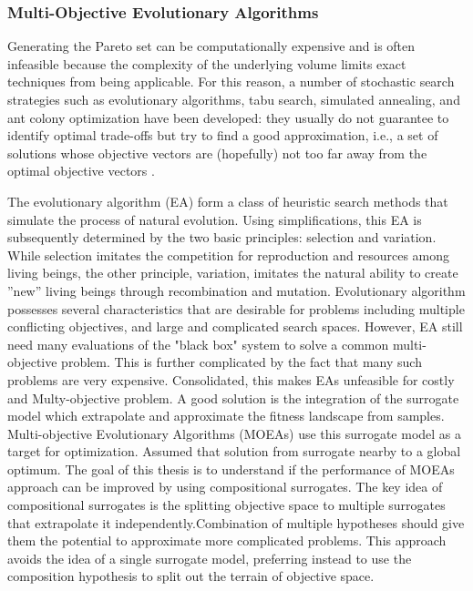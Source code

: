 
            \subsubsection{Multi-Objective Evolutionary Algorithms}

                Generating the Pareto set can be computationally expensive and is often infeasible because the complexity of the underlying volume limits exact techniques from being applicable. For this reason, a number of stochastic search strategies such as evolutionary algorithms, tabu search, simulated annealing, and ant colony optimization have been developed: they usually do not guarantee to identify optimal trade-offs but try to find a good approximation, i.e., a set of solutions whose objective vectors are (hopefully) not too far away from the optimal objective vectors \cite{EmmerichD18}.

                The evolutionary algorithm (EA) form a class of heuristic search methods that simulate the process of natural evolution.
                Using simplifications, this EA is subsequently determined by the two basic principles: selection and variation.
                While selection imitates the competition for reproduction and resources among living beings, the other principle, variation, imitates the natural ability to create ”new” living beings through recombination and mutation. Evolutionary algorithm possesses several characteristics that are desirable for problems including multiple conflicting objectives, and large and complicated search spaces. However, EA still need many evaluations of the "black box" system to solve a common multi-objective problem. This is further complicated by the fact that many such problems are very expensive. Consolidated, this makes EAs unfeasible for costly and Multy-objective problem.
                A good solution is the integration of the surrogate model which extrapolate and approximate the fitness landscape from samples. Multi-objective Evolutionary Algorithms (MOEAs) use this surrogate model as a target for optimization. Assumed that solution from surrogate nearby to a global optimum.
                The goal of this thesis is to understand if the performance of MOEAs approach can be improved by using compositional surrogates. The key idea of compositional surrogates is the splitting objective space to multiple surrogates that extrapolate it independently.Combination of multiple hypotheses should give them the potential to approximate more complicated problems. This approach avoids the idea of a single surrogate model, preferring instead to use the composition hypothesis to split out the terrain of objective space.

